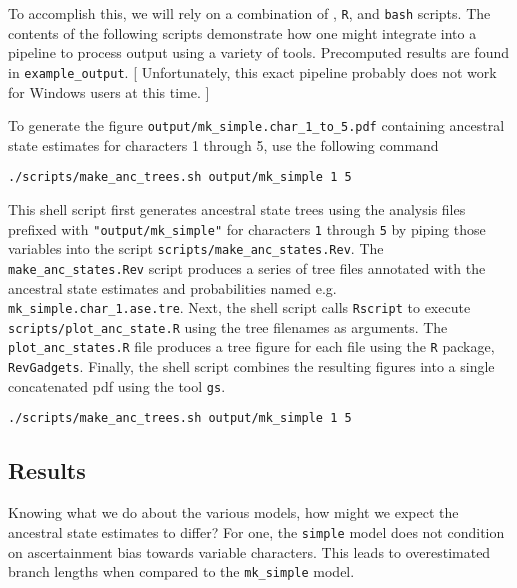 To accomplish this, we will rely on a combination of \RevBayes, {\tt R}, and {\tt bash} scripts.
The contents of the following scripts demonstrate how one might integrate \RevBayes into a pipeline to process output using a variety of tools.
Precomputed results are found in {\tt example\_output}.
[ Unfortunately, this exact pipeline probably does not work for Windows users at this time. ]

To generate the figure {\tt output/mk\_simple.char\_1\_to\_5.pdf} containing ancestral state estimates for characters 1 through 5, use the following command

{\tt \begin{snugshade*}
\begin{lstlisting}
./scripts/make_anc_trees.sh output/mk_simple 1 5
\end{lstlisting}
\end{snugshade*}}

This shell script first generates ancestral state trees using the analysis files prefixed with {\tt "output/mk\_simple"} for characters {\tt 1} through {\tt 5} by piping those variables into the \RevBayes script {\tt scripts/make\_anc\_states.Rev}.
The {\tt make\_anc\_states.Rev} script produces a series of tree files annotated with the ancestral state estimates and probabilities named e.g. {\tt mk\_simple.char\_1.ase.tre}.
Next, the shell script calls {\tt Rscript} to execute {\tt scripts/plot\_anc\_state.R} using the tree filenames as arguments.
The {\tt plot\_anc\_states.R} file produces a tree figure for each file using the {\tt R} package, {\tt RevGadgets}.
Finally, the shell script combines the resulting figures into a single concatenated pdf using the tool {\tt gs}.



{\tt \begin{snugshade*}
\begin{lstlisting}
./scripts/make_anc_trees.sh output/mk_simple 1 5
\end{lstlisting}
\end{snugshade*}}




\subsection{Results}

Knowing what we do about the various models, how might we expect the ancestral state estimates to differ?
For one, the {\tt simple} model does not condition on ascertainment bias towards variable characters.
This leads to overestimated branch lengths when compared to the {\tt mk\_simple} model.

